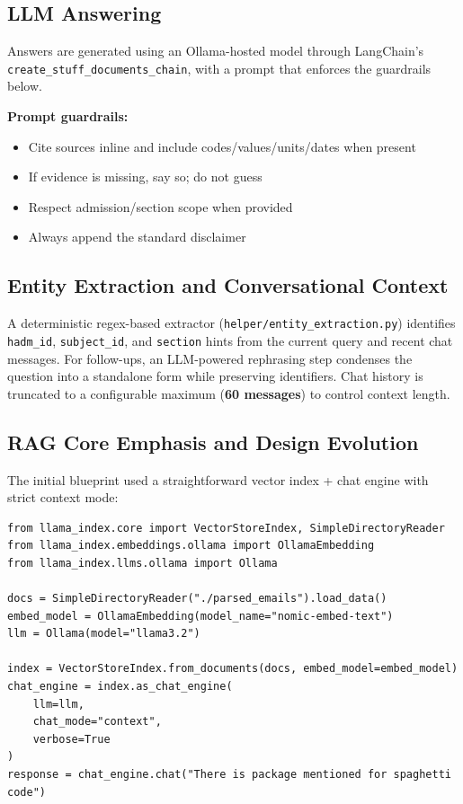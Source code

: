 \subsection{LLM Answering}
Answers are generated using an Ollama-hosted model through LangChain's \newline\texttt{create\_stuff\_documents\_chain}, with a prompt that enforces the guardrails below.

\noindent \textbf{Prompt guardrails:}
\begin{itemize}
  \item Cite sources inline and include codes/values/units/dates when present
  \item If evidence is missing, say so; do not guess
  \item Respect admission/section scope when provided
  \item Always append the standard disclaimer
\end{itemize}

\subsection{Entity Extraction and Conversational Context}
A deterministic regex-based extractor (\texttt{helper/entity\_extraction.py}) identifies \texttt{hadm\_id}, \texttt{subject\_id}, and \texttt{section} hints from the current query and recent chat messages. For follow-ups, an LLM-powered rephrasing step condenses the question into a standalone form while preserving identifiers. Chat history is truncated to a configurable maximum (\textbf{60 messages}) to control context length.

\subsection{RAG Core Emphasis and Design Evolution}
The initial blueprint used a straightforward vector index + chat engine with strict context mode:
\begin{verbatim}
from llama_index.core import VectorStoreIndex, SimpleDirectoryReader
from llama_index.embeddings.ollama import OllamaEmbedding
from llama_index.llms.ollama import Ollama

docs = SimpleDirectoryReader("./parsed_emails").load_data()
embed_model = OllamaEmbedding(model_name="nomic-embed-text")
llm = Ollama(model="llama3.2")

index = VectorStoreIndex.from_documents(docs, embed_model=embed_model)
chat_engine = index.as_chat_engine(
    llm=llm,
    chat_mode="context",
    verbose=True
)
response = chat_engine.chat("There is package mentioned for spaghetti code")
\end{verbatim}

